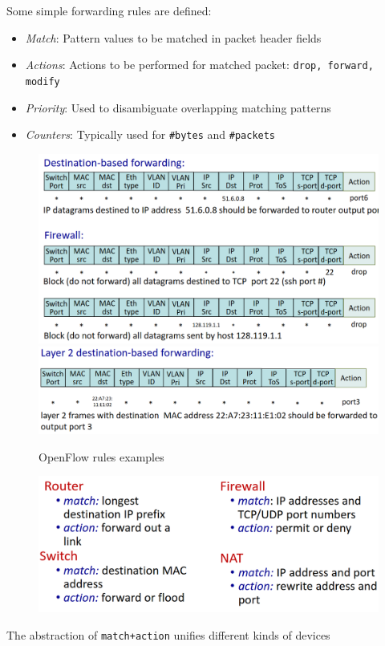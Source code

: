 \begin{paracol}{2}
   Some simple forwarding rules are defined:
   \begin{itemize}
      \item \textit{Match}:
      Pattern values to be matched in packet header fields
      \item \textit{Actions}:
      Actions to be performed for matched packet: \texttt{drop, forward, modify} 
      \item \textit{Priority}:
      Used to disambiguate overlapping matching patterns
      \item \textit{Counters}:
      Typically used for \texttt{\#bytes} and \texttt{\#packets}   
   \end{itemize}

   \switchcolumn
   \begin{figure}[htbp]
      \centering
      \includegraphics{images/openflow_rulesexamples.png}\\
      \includegraphics{images/openflow_rulesexamples1.png}
      \caption{OpenFlow rules examples}
      \label{fig:openflow_rulesexamples}
   \end{figure}
\end{paracol}


\begin{figure}[htbp]
   \centering
   \includegraphics{images/openflow_matchaction.png}
   \label{fig:openflow_matchaction}
\end{figure}
The abstraction of \texttt{match+action} unifies different kinds of devices

